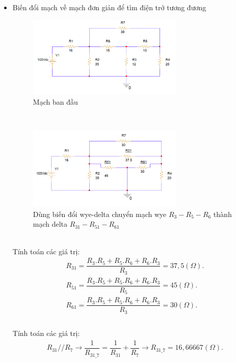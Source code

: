 \begin{itemize}
    \item Biến đổi mạch về mạch đơn giản để tìm điện trở tương đương\\
    \begin{figure}[!htbp]
        \centering
        \includegraphics[width=0.7\textwidth]{graphics/ex10/f2.png}
        \caption{Mạch ban đầu}
        \end{figure}\\
        \begin{figure}[!htbp]
            \centering
            \includegraphics[width=0.7\textwidth]{graphics/ex10/f3.png}
            \caption{Dùng biến đổi wye-delta chuyển mạch wye \(R_3-R_5-R_6\) thành mạch delta \(R_{31}-R_{51}-R_{61}\)}
            \end{figure}\\
    Tính toán các giá trị:
    \begin{align*}
        R_{31} = \dfrac{R_3.R_5 + R_5.R_6 + R_6.R_3}{R_3} = 37,5 (\Omega).\\
        R_{51} = \dfrac{R_3.R_5 + R_5.R_6 + R_6.R_3}{R_5} = 45 (\Omega).\\
        R_{61} = \dfrac{R_3.R_5 + R_5.R_6 + R_6.R_3}{R_3} = 30 (\Omega).\\
    \end{align*}\\
    Tính toán các giá trị:
    \begin{align*}
        R_{31} // R_7 \rightarrow \dfrac{1}{R_{31\_7}} = \dfrac{1}{R_{31}} + \dfrac{1}{R_7} \rightarrow R_{31\_7} = 16,66667 (\Omega).\\

\end{align*}
\end{itemize}
